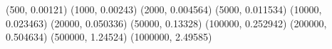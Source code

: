 (500, 0.00121) (1000, 0.00243) (2000, 0.004564) (5000, 0.011534) (10000, 0.023463) (20000, 0.050336) (50000, 0.13328) (100000, 0.252942) (200000, 0.504634) (500000, 1.24524) (1000000, 2.49585) 